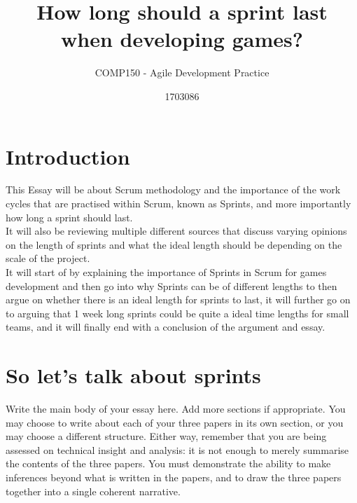 \documentclass{scrartcl}
\title{How long should a sprint last\\when developing games?}
\subtitle{COMP150 - Agile Development Practice}
\author{1703086}
\begin{document}
\maketitle


\section{Introduction}
\iffalse
Write your introduction here. A brief introduction is recommended, which should outline key details of the chosen topic and the reviewed papers, motivate the work, and provide a roadmap of key points to the reader. The motivation is quite important here, as essays should have a contribution (i.e., what is the point of the essay, and what does the reader take away from the essay) and the link between the motivation (in the introduction) and the contribution (in the conclusion) should be made clear.
\fi
This Essay will be about Scrum methodology and the importance of the work cycles that are practised within Scrum, known as Sprints, and more importantly how long a sprint should last.\\
It will also be reviewing multiple different sources that discuss varying opinions on the length of sprints and what the ideal length should be depending on the scale of the project.\\
It will start of by explaining the importance of Sprints in Scrum for games development and then go into why Sprints can be of different lengths to then argue on whether there is an ideal length for sprints to last, it will further go on to arguing that 1 week long sprints could be quite a ideal time lengths for small teams, and it will finally end with a conclusion of the argument and essay.


\section{So let's talk about sprints}
\iffalse
Write the main body of your essay here. Add more sections if appropriate. You may choose to write about each of your three papers in its own section, or you may choose a different structure. Either way, remember that you are being assessed on technical insight and analysis: it is not enough to merely summarise the contents of the three papers. You must demonstrate the ability to make inferences beyond what is written in the papers, and to draw the three papers together into a single coherent narrative.
\end{document}
